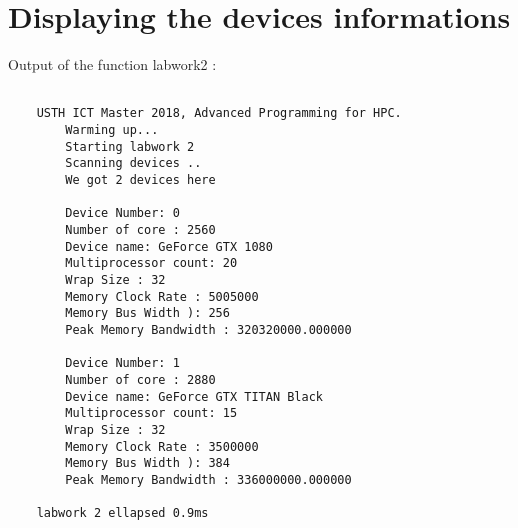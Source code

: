 \documentclass[paper=a4, fontsize=11pt]{scrartcl}
\begin{document}
\section{Displaying the devices informations}

Output of the function labwork2 : 


	\begin{verbatim}

	USTH ICT Master 2018, Advanced Programming for HPC.
		Warming up...
		Starting labwork 2
		Scanning devices ..
		We got 2 devices here

		Device Number: 0
		Number of core : 2560
		Device name: GeForce GTX 1080
		Multiprocessor count: 20
		Wrap Size : 32
		Memory Clock Rate : 5005000
		Memory Bus Width ): 256
		Peak Memory Bandwidth : 320320000.000000

		Device Number: 1
		Number of core : 2880
		Device name: GeForce GTX TITAN Black
		Multiprocessor count: 15
		Wrap Size : 32
		Memory Clock Rate : 3500000
		Memory Bus Width ): 384
		Peak Memory Bandwidth : 336000000.000000

	labwork 2 ellapsed 0.9ms

	\end{verbatim}
\end{document}
